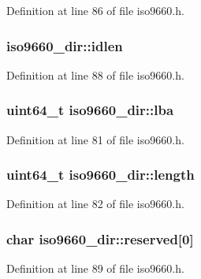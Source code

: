 Definition at line 86 of file iso9660.\+h.

\hypertarget{structiso9660__dir_a6b591363e79296cc8b68df9b481e1ff8}{
\subsubsection[{idlen}]{ iso9660\+\_\+dir\+::idlen}}\label{structiso9660__dir_a6b591363e79296cc8b68df9b481e1ff8}


Definition at line 88 of file iso9660.\+h.

\hypertarget{structiso9660__dir_aa953c10b14a6fcaf2d71a067df031def}{
\subsubsection[{lba}]{\setlength{\rightskip}{0pt plus 5cm}uint64\+\_\+t iso9660\+\_\+dir\+::lba}}\label{structiso9660__dir_aa953c10b14a6fcaf2d71a067df031def}


Definition at line 81 of file iso9660.\+h.

\hypertarget{structiso9660__dir_a8c14ed10aeaa7fa626b5d03b3902e083}{
\subsubsection[{length}]{\setlength{\rightskip}{0pt plus 5cm}uint64\+\_\+t iso9660\+\_\+dir\+::length}}\label{structiso9660__dir_a8c14ed10aeaa7fa626b5d03b3902e083}


Definition at line 82 of file iso9660.\+h.

\hypertarget{structiso9660__dir_a6350cc135fe835f4372fcf9a0cfe0fcc}{
\subsubsection[{reserved}]{\setlength{\rightskip}{0pt plus 5cm}char iso9660\+\_\+dir\+::reserved\mbox{[}0\mbox{]}}}\label{structiso9660__dir_a6350cc135fe835f4372fcf9a0cfe0fcc}


Definition at line 89 of file iso9660.\+h.

